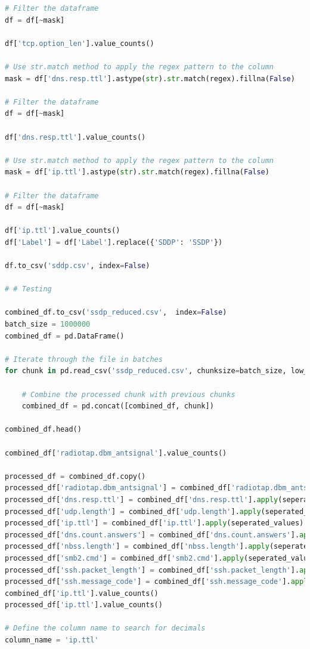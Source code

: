 \begin{appendices}
\begin{lstlisting}[language=Python]
# Filter the dataframe
df = df[~mask]

df['tcp.option_len'].value_counts()

# Use str.match method to apply the regex pattern to the column
mask = df['dns.resp.ttl'].astype(str).str.match(regex).fillna(False)

# Filter the dataframe
df = df[~mask]

df['dns.resp.ttl'].value_counts()

# Use str.match method to apply the regex pattern to the column
mask = df['ip.ttl'].astype(str).str.match(regex).fillna(False)

# Filter the dataframe
df = df[~mask]

df['ip.ttl'].value_counts()
df['Label'] = df['Label'].replace({'SDDP': 'SSDP'})

df.to_csv('sddp.csv', index=False)

# # Testing

combined_df.to_csv('ssdp_reduced.csv',  index=False)
batch_size = 1000000
combined_df = pd.DataFrame()

# Iterate through the file in batches
for chunk in pd.read_csv('ssdp_reduced.csv', chunksize=batch_size, low_memory=False):
    
    # Combine the processed chunk with previous chunks
    combined_df = pd.concat([combined_df, chunk])

combined_df.head()

combined_df['radiotap.dbm_antsignal'].value_counts()

processed_df = combined_df.copy()
processed_df['radiotap.dbm_antsignal'] = combined_df['radiotap.dbm_antsignal'].apply(seperated_values)
processed_df['dns.resp.ttl'] = combined_df['dns.resp.ttl'].apply(seperated_values)
processed_df['udp.length'] = combined_df['udp.length'].apply(seperated_values)
processed_df['ip.ttl'] = combined_df['ip.ttl'].apply(seperated_values)
processed_df['dns.count.answers'] = combined_df['dns.count.answers'].apply(seperated_values)
processed_df['nbss.length'] = combined_df['nbss.length'].apply(seperated_values)
processed_df['smb2.cmd'] = combined_df['smb2.cmd'].apply(seperated_values)
processed_df['ssh.packet_length'] = combined_df['ssh.packet_length'].apply(seperated_values)
processed_df['ssh.message_code'] = combined_df['ssh.message_code'].apply(seperated_values)
combined_df['ip.ttl'].value_counts()
processed_df['ip.ttl'].value_counts()

# Define the column name to search for decimals
column_name = 'ip.ttl'


\end{lstlisting}
\end{appendices}
